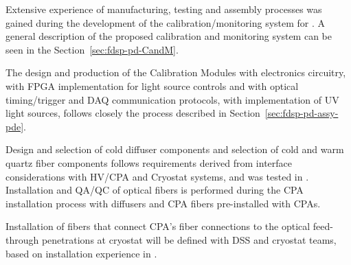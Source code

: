 Extensive experience of manufacturing, testing and assembly processes was gained during the development of the calibration/monitoring system for .
A general description of the proposed calibration and monitoring system can be seen in the Section~\ref{sec:fdsp-pd-CandM}. 

The design and production of the Calibration Modules with electronics circuitry, with FPGA implementation for light source controls and with optical timing/trigger and DAQ communication protocols, with implementation of UV light sources, follows closely the process described in Section~\ref{sec:fdsp-pd-assy-pde}.

Design and selection of cold diffuser components and selection of cold and warm quartz fiber components follows requirements derived from interface considerations with HV/CPA and Cryostat systems, and was tested in .
Installation and QA/QC of optical fibers is performed during the CPA installation process with diffusers and CPA fibers pre-installed with CPAs.

Installation of fibers that connect CPA's fiber connections to the optical feed-through penetrations at cryostat will be defined with DSS and cryostat teams, based on installation experience in . 